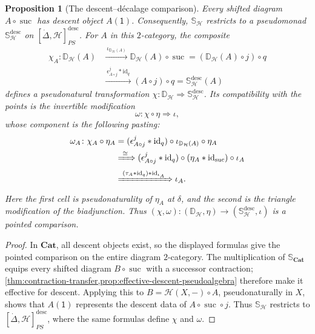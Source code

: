 \documentclass[11pt,a4paper]{article}
\numberwithin{equation}{section}
\newtheorem{proposition}[proposition]{Proposition}
\theoremstyle{definition}
\theoremstyle{remark}
\newcommand{\id}{\mathrm{id}}
\newcommand{\Hcat}{\mathcal H}
\newcommand{\Cat}{\mathbf{Cat}}
\newcommand{\suc}{\operatorname{suc}}
\newcommand{\Dmon}{\mathbb D}
\newcommand{\Smon}{\mathbb S}
\begin{document}
\begin{proposition}[The descent--d\'ecalage comparison]
\label{prop:descent-successor-comparison}
Every shifted diagram $A\circ\suc$ has descent object $A(\mathsf1)$.
Consequently, $\Smon_{\Hcat}$ restricts to a pseudomonad
$\Smon_{\Hcat}^{\mathrm{desc}}$ on
$[\dot\Delta,\Hcat]_{PS}^{\mathrm{desc}}$.
For $A$ in this $2$-category, the composite
\begin{equation}
\begin{split}
  \chi_A\colon\Dmon_{\Hcat}(A)
  &\xrightarrow{\ \iota_{\Dmon_{\Hcat}(A)}\ }
  \Dmon_{\Hcat}(A)\circ\suc
  =(\Dmon_{\Hcat}(A)\circ j)\circ q\\
  &\xrightarrow{\ \epsilon^j_{A\circ j}\ast\id_q\ }
  (A\circ j)\circ q=\Smon_{\Hcat}^{\mathrm{desc}}(A)
\end{split}
\label{eq:chi-component}
\end{equation}
defines a pseudonatural transformation
$\chi\colon\Dmon_{\Hcat}\Rightarrow\Smon_{\Hcat}^{\mathrm{desc}}$.
Its compatibility with the points is the invertible modification
\begin{equation}
  \omega\colon\chi\circ\eta\Longrightarrow\iota,
  \label{eq:descent-successor-comparison}
\end{equation}
whose component is the following pasting:
\begin{equation}
\begin{aligned}
  \omega_A\colon\chi_A\circ\eta_A
  &=(\epsilon^j_{A\circ j}\ast\id_q)
       \circ\iota_{\Dmon_{\Hcat}(A)}\circ\eta_A\\
  &\xRightarrow{\ \cong\ }
    (\epsilon^j_{A\circ j}\ast\id_q)
       \circ(\eta_A\ast\id_{\suc})\circ\iota_A\\
  &\xRightarrow{\ (\tau_A\ast\id_q)\ast\id_{\iota_A}\ }
    \iota_A.
\end{aligned}
\label{eq:chi-point}
\end{equation}
Here the first cell is pseudonaturality of $\eta_A$ at $\delta$,
and the second is the triangle modification of the biadjunction.
Thus $(\chi,\omega)\colon(\Dmon_{\Hcat},\eta)
\to(\Smon_{\Hcat}^{\mathrm{desc}},\iota)$ is a pointed comparison.
\end{proposition}

\begin{proof}
In $\Cat$, all descent objects exist, so the displayed formulas give
the pointed comparison on the entire diagram $2$-category.
The multiplication of $\Smon_{\Cat}$ equips every shifted diagram
$B\circ\suc$ with a successor contraction;
\cref{thm:contraction-transfer,prop:effective-descent-pseudoalgebra}
therefore make it effective for descent. Applying this to
$B=\Hcat(X,-)\circ A$, pseudonaturally in $X$, shows that
$A(\mathsf1)$ represents the descent data of $A\circ\suc\circ j$.
Thus $\Smon_{\Hcat}$ restricts to
$[\dot\Delta,\Hcat]_{PS}^{\mathrm{desc}}$, where the same formulas
define $\chi$ and $\omega$.
\end{proof}
\end{document}
